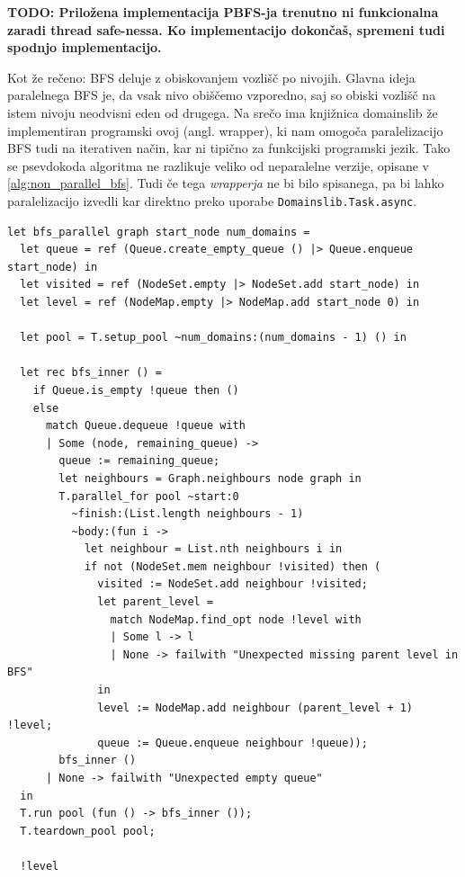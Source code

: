 \documentclass[mat1, tisk]{fmfdelo}
\begin{document}
\textbf{TODO: Priložena implementacija PBFS-ja trenutno ni funkcionalna zaradi thread safe-nessa. Ko implementacijo dokončaš, spremeni tudi spodnjo implementacijo.}

Kot že rečeno: BFS deluje z obiskovanjem vozlišč po nivojih. Glavna ideja paralelnega BFS je, da vsak nivo obiščemo vzporedno, saj so obiski vozlišč na 
istem nivoju neodvisni eden od drugega.
Na srečo ima knjižnica domainslib že implementiran programski ovoj (angl. wrapper), ki nam omogoča paralelizacijo BFS tudi na iterativen način,
kar ni tipično za funkcijski programski jezik. Tako se psevdokoda algoritma ne razlikuje veliko od neparalelne verzije, opisane v \ref{alg:non_parallel_bfs}.
Tudi če tega \textit{wrapperja} ne bi bilo spisanega, pa bi lahko paralelizacijo izvedli kar direktno preko uporabe \texttt{Domainslib.Task.async}.

\begin{lstlisting}
let bfs_parallel graph start_node num_domains =
  let queue = ref (Queue.create_empty_queue () |> Queue.enqueue start_node) in
  let visited = ref (NodeSet.empty |> NodeSet.add start_node) in
  let level = ref (NodeMap.empty |> NodeMap.add start_node 0) in

  let pool = T.setup_pool ~num_domains:(num_domains - 1) () in

  let rec bfs_inner () =
    if Queue.is_empty !queue then ()
    else
      match Queue.dequeue !queue with
      | Some (node, remaining_queue) ->
        queue := remaining_queue;
        let neighbours = Graph.neighbours node graph in
        T.parallel_for pool ~start:0
          ~finish:(List.length neighbours - 1)
          ~body:(fun i ->
            let neighbour = List.nth neighbours i in
            if not (NodeSet.mem neighbour !visited) then (
              visited := NodeSet.add neighbour !visited;
              let parent_level =
                match NodeMap.find_opt node !level with
                | Some l -> l
                | None -> failwith "Unexpected missing parent level in BFS"
              in
              level := NodeMap.add neighbour (parent_level + 1) !level;
              queue := Queue.enqueue neighbour !queue));
        bfs_inner ()
      | None -> failwith "Unexpected empty queue"
  in
  T.run pool (fun () -> bfs_inner ());
  T.teardown_pool pool;

  !level
  \end{lstlisting}
\end{document}
